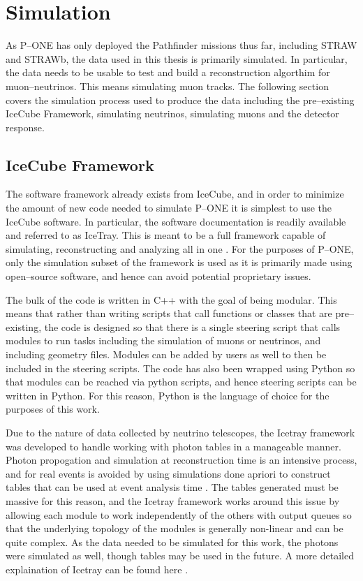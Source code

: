\chapter{Simulation}

As P--ONE has only deployed the Pathfinder missions thus far, including STRAW and STRAWb, the data used in this thesis is primarily simulated. In particular, the data needs to be usable to test and build a reconstruction algorthim for muon--neutrinos. This means simulating muon tracks. The following section covers the simulation process used to produce the data including the pre--existing IceCube Framework, simulating neutrinos, simulating muons and the detector response. 

\section{IceCube Framework}

The software framework already exists from IceCube, and in order to minimize the amount of new code needed to simulate P--ONE it is simplest to use the IceCube software. In particular, the software documentation is readily available \cite{icetray, icetray_art} and referred to as IceTray. This is meant to be a full framework capable of simulating, reconstructing and analyzing all in one \cite{icetray, icetray_art}. For the purposes of P--ONE, only the simulation subset of the framework is used as it is primarily made using open--source software, and hence can avoid potential proprietary issues.

The bulk of the code is written in C++ with the goal of being modular. This means that rather than writing scripts that call functions or classes that are pre--existing, the code is designed so that there is a single steering script that calls modules to run tasks including the simulation of muons or neutrinos, and including geometry files. Modules can be added by users as well to then be included in the steering scripts. The code has also been wrapped using Python so that modules can be reached via python scripts, and hence steering scripts can be written in Python. For this reason, Python is the language of choice for the purposes of this work.

Due to the nature of data collected by neutrino telescopes, the Icetray framework was developed to handle working with photon tables in a manageable manner. Photon propogation and simulation at reconstruction time is an intensive process, and for real events is avoided by using simulations done apriori to construct tables that can be used at event analysis time \cite{icetray_art}. The tables generated must be massive for this reason, and the Icetray framework works around this issue by allowing each module to work independently of the others with output queues so that the underlying topology of the modules is generally non-linear and can be quite complex. As the data needed to be simulated for this work, the photons were simulated as well, though tables may be used in the future. A more detailed explaination of Icetray can be found here \cite{icetray_art}.

